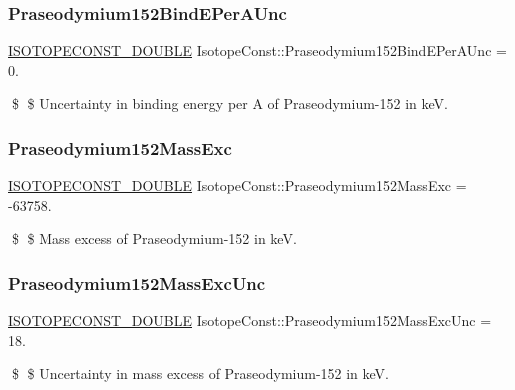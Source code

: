 \subsubsection{\texorpdfstring{Praseodymium152\+Bind\+E\+Per\+A\+Unc}{Praseodymium152BindEPerAUnc}}
{\footnotesize\ttfamily \mbox{\hyperlink{group___isotope_const-_macros_ga8f45a7272ce02c0b4c65c44636ed719a}{I\+S\+O\+T\+O\+P\+E\+C\+O\+N\+S\+T\+\_\+\+D\+O\+U\+B\+LE}} Isotope\+Const\+::\+Praseodymium152\+Bind\+E\+Per\+A\+Unc = 0.}

\$ \$ Uncertainty in binding energy per A of Praseodymium-\/152 in keV. \mbox{\label{group___isotope_const-_praseodymium-_pr152_ga52c4c7fe3a24ce974af356292fead9ad}} 
\subsubsection{\texorpdfstring{Praseodymium152\+Mass\+Exc}{Praseodymium152MassExc}}
{\footnotesize\ttfamily \mbox{\hyperlink{group___isotope_const-_macros_ga8f45a7272ce02c0b4c65c44636ed719a}{I\+S\+O\+T\+O\+P\+E\+C\+O\+N\+S\+T\+\_\+\+D\+O\+U\+B\+LE}} Isotope\+Const\+::\+Praseodymium152\+Mass\+Exc = -\/63758.}

\$ \$ Mass excess of Praseodymium-\/152 in keV. \mbox{\label{group___isotope_const-_praseodymium-_pr152_gae1c86f105825f520e69df985a44cc7ff}} 
\subsubsection{\texorpdfstring{Praseodymium152\+Mass\+Exc\+Unc}{Praseodymium152MassExcUnc}}
{\footnotesize\ttfamily \mbox{\hyperlink{group___isotope_const-_macros_ga8f45a7272ce02c0b4c65c44636ed719a}{I\+S\+O\+T\+O\+P\+E\+C\+O\+N\+S\+T\+\_\+\+D\+O\+U\+B\+LE}} Isotope\+Const\+::\+Praseodymium152\+Mass\+Exc\+Unc = 18.}

\$ \$ Uncertainty in mass excess of Praseodymium-\/152 in keV. \mbox{\label{group___isotope_const-_praseodymium-_pr152_ga83ce46850927a78f9a5c0f0cecee359e}} 
